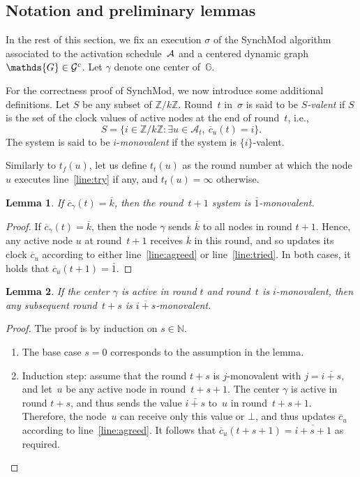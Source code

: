 \documentclass{article}
\newtheorem{lemma}{Lemma}[section]
\newcommand{\cent}{\gamma}
\newcommand{\dG}{\mathds{G}}
\newcommand{\IN}{\mathds{N}}
\newcommand{\tf}{t_{f}}
\newcommand{\try}{t_{t}}
\begin{document}
\subsection{Notation and preliminary lemmas}

In the rest of this section, we fix an execution $\sigma$ of the SynchMod algorithm associated to the activation 
	schedule~${\cal A}$ and a centered dynamic graph~$\dG \in {\cal G}^c$. %
Let $\cent$ denote one center of~$\dG$.	

For the correctness proof of SynchMod, we now introduce some additional definitions.
Let $S$ be any subset of $ \mathds{Z}/k\mathds{Z}$.
Round~$t$ in~$\sigma$  is said to be \emph{$S$-valent}  if $S$ is the set of the clock values of active nodes at the end of round~$t$, i.e.,
	$$ S = \{i  \in \mathds{Z}/k\mathds{Z} : \exists u \in \mathcal{A}_t, \ \overline{c}_u (t) = i \}  . $$
The system is said to be $i$-\emph{monovalent}  if the system is $\{ i\}$-valent.

Similarly to $\tf (u)$, let us define $\try (u)$  as the round number at which the node~$u$ executes line~\ref{line:try} 
	if any, and $\try (u)= \infty$ otherwise.

\begin{lemma}\label{lem:k_mono}
If $\overline{c}_\cent(t) = \overline{k} $, then the round~$t +1$ system is $\overline{1}$-monovalent.
\end{lemma}

\begin{proof}
If $\overline{c}_\cent(t) = \overline{k} $, then the node $\cent$ sends $\overline{k}$ to all nodes in round $t+1$.
Hence, any active node $u$ at round~$t+1$ receives $\overline{k}$ in this round,
	and so updates its clock $\overline{c}_u$ according to either line~\ref{line:agreed} or line~\ref{line:tried}.
In both cases, it holds that $\overline{c}_u (t+1) =\overline{1}$.
\end{proof}

\begin{lemma}\label{lem:mono_mono}
If the center $\cent$ is active in round $t$  and round~$t$ is $i$-monovalent, 
	then any subsequent round~$ t + s$ is $\overline{i+ s}$-monovalent.
\end{lemma}

\begin{proof}
The proof is by induction on $s \in \IN$.
\begin{enumerate}
		\item The base case $s=0$ corresponds to the assumption in the lemma.
		\item Induction step:  assume that the round $t+s$ is $j$-monovalent with $j = \overline{i+s} $,
			 and let~$u$ be  any active node in round~$t+s+1$.
			The center $\cent$ is active in round $t +s$, and thus sends the value $\overline{i+s}$ to~$u$
				in round~$ t+s+1$.
			Therefore, the node~$u$ can receive only this value or $\bot$, and thus updates
				$\overline{c}_u$ according to line~\ref{line:agreed}. 
			It follows that $ \overline{c}_u(t+s+1) = \overline{i+s +1}$ as required.
\end{enumerate}
\end{proof}
\end{document}
